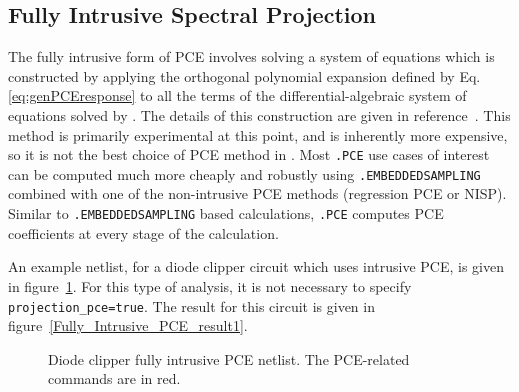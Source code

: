 \subsection{Fully Intrusive Spectral Projection}
\label{intrusivePCE}
The fully intrusive form of PCE involves solving a system of equations which is constructed by 
applying the orthogonal polynomial expansion defined by 
Eq. \eqref{eq:genPCEresponse} to all the terms of the differential-algebraic 
system of equations solved by \Xyce{}.  The details of this construction are given in 
reference~\cite{xyceAdvancedUQ}.  This method is primarily experimental at this
point, and is inherently more expensive,
so it is not the best choice of PCE method in \Xyce{}.   Most \texttt{.PCE} use cases of
interest can be computed much more cheaply and robustly using \texttt{.EMBEDDEDSAMPLING} 
combined with one of the non-intrusive PCE methods (regression PCE or NISP).
Similar to \texttt{.EMBEDDEDSAMPLING} based calculations, \texttt{.PCE} computes
PCE coefficients at every stage of the calculation.   

An example netlist, for a diode clipper circuit which uses intrusive PCE, is given in figure~\ref{Fully_Intrusive_PCE_netlist1}.
For this type of analysis, it is not necessary to specify \texttt{projection\_pce=true}.  The result for this circuit 
is given in figure~\ref{Fully_Intrusive_PCE_result1}.  
\begin{figure}[htbp]
\fontsize{9pt}{10pt}
\begin{centering}
\caption{Diode clipper fully intrusive PCE netlist.
 The PCE-related commands are in \color{red}red\color{black}.
\label{Fully_Intrusive_PCE_netlist1}}
\end{centering}
\end{figure}

